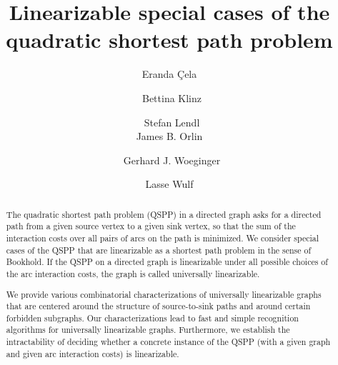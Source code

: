 \documentclass[runningheads]{llncs}
\begin{document}
\sloppy

\renewcommand{\topfraction}{1.0}
\renewcommand{\bottomfraction}{1.0}

\newcommand{\qqed}{~~$\Box$}
\newcommand{\RRR}{{\mathbb{R}_{\ge0}}}

\newcommand{\spp}{\text{SPP}}
\newcommand{\qspp}{\text{QSPP}}
\newcommand{\ppp}{{\cal P}_{st}}
\newcommand{\pppx}{{\cal P}^+}
\newcommand{\pppy}{{\cal P}^-}

\newcommand{\boxxx}[1]
 {\fbox{\begin{minipage}{11.80cm}\begin{center}\bigskip\begin{minipage}{11.30cm}
  #1\end{minipage}\end{center}~\end{minipage}}}


\title{Linearizable special cases of the quadratic shortest path problem}

\author{Eranda \c{C}ela\and
~Bettina Klinz\and
~Stefan Lendl\\
James B. Orlin\and
~Gerhard J. Woeginger\and
Lasse Wulf}


\maketitle              %

\begin{abstract}
The quadratic shortest path problem (QSPP) in a directed graph asks for a directed path 
from a given source vertex to a given sink vertex, so that the sum of the interaction 
costs over all pairs of arcs on the path is minimized.
We consider special cases of the QSPP that are linearizable as a shortest path problem
in the sense of Bookhold.
If the QSPP on a directed graph is linearizable under all possible choices of the arc 
interaction costs, the graph is called universally linearizable.

We provide various combinatorial characterizations of universally linearizable graphs that 
are centered around the structure of source-to-sink paths and around certain forbidden subgraphs.
Our characterizations lead to fast and simple recognition algorithms for universally 
linearizable graphs.
Furthermore, we establish the intractability of deciding whether a concrete instance of 
the QSPP (with a given graph and given arc interaction costs) is linearizable.
\end{abstract}
\end{document}
